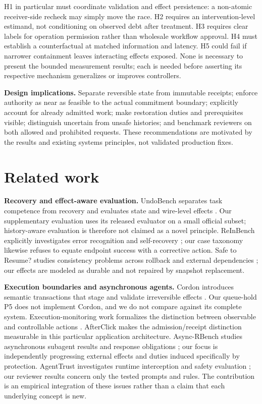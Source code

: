 \documentclass[10pt]{article}
\begin{document}
H1 in particular must coordinate validation and effect persistence: a non-atomic receiver-side recheck may simply move the race. H2 requires an intervention-level estimand, not conditioning on observed debt after treatment. H3 requires clear labels for operation permission rather than wholesale workflow approval. H4 must establish a counterfactual at matched information and latency. H5 could fail if narrower containment leaves interacting effects exposed. None is necessary to present the bounded measurement results; each is needed before asserting its respective mechanism generalizes or improves controllers.

\textbf{Design implications.} Separate reversible state from immutable receipts; enforce authority as near as feasible to the actual commitment boundary; explicitly account for already admitted work; make restoration duties and prerequisites visible; distinguish uncertain from unsafe histories; and benchmark reviewers on both allowed and prohibited requests. These recommendations are motivated by the results and existing systems principles, not validated production fixes.
\section{Related work}
\textbf{Recovery and effect-aware evaluation.} UndoBench separates task competence from recovery and evaluates state and wire-level effects \cite{undo}. Our supplementary evaluation uses its released evaluator on a small official subset; history-aware evaluation is therefore not claimed as a novel principle. ReInBench explicitly investigates error recognition and self-recovery \cite{rein}; our case taxonomy likewise refuses to equate endpoint success with a corrective action. Safe to Resume? studies consistency problems across rollback and external dependencies \cite{resume}; our effects are modeled as durable and not repaired by snapshot replacement.

\textbf{Execution boundaries and asynchronous agents.} Cordon introduces semantic transactions that stage and validate irreversible effects \cite{cordon}. Our queue-hold P5 does not implement Cordon, and we do not compare against its complete system. Execution-monitoring work formalizes the distinction between observable and controllable actions \cite{basin}. AfterClick makes the admission/receipt distinction measurable in this particular application architecture. Async-RBench studies asynchronous subagent results and response obligations \cite{async}; our focus is independently progressing external effects and duties induced specifically by protection. AgentTrust investigates runtime interception and safety evaluation \cite{agenttrust}; our reviewer results concern only the tested prompts and rules. The contribution is an empirical integration of these issues rather than a claim that each underlying concept is new.
\end{document}
